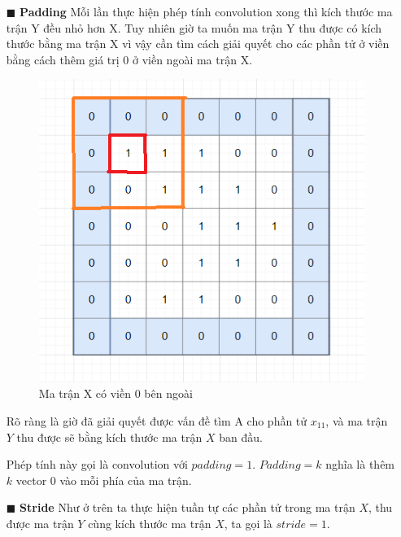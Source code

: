 \begin{itemize}
\item[$\blacksquare$] \textbf{Padding}
Mỗi lần thực hiện phép tính convolution xong thì kích thước ma trận Y đều nhỏ hơn X. Tuy nhiên giờ ta muốn ma trận Y thu được có kích thước bằng ma trận X vì vậy cần tìm cách giải quyết cho các phần tử ở viền bằng cách thêm giá trị 0 ở viền ngoài ma trận X.

\FloatBarrier
\begin{figure}[htp]
\begin{center}
\includegraphics[scale=0.65]{chap2/c2_figs/10.png}
\end{center}
\caption{Ma trận X có viền 0 bên ngoài}
\label{fig:padding}
\end{figure}
\FloatBarrier

Rõ ràng là giờ đã giải quyết được vấn đề tìm A cho phần tử $x_{11}$, và ma trận $Y$ thu được sẽ bằng kích thước ma trận $X$ ban đầu.

Phép tính này gọi là convolution với $padding=1$. $Padding=k$ nghĩa là thêm $k$ vector $0$ vào mỗi phía của ma trận.

\item[$\blacksquare$] \textbf{Stride}
Như ở trên ta thực hiện tuần tự các phần tử trong ma trận $X$, thu được ma trận $Y$ cùng kích thước ma trận $X$, ta gọi là $stride=1$.


\end{itemize}
